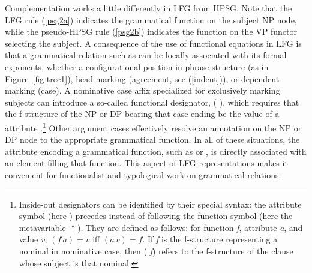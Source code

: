 Complementation works a little differently in LFG from HPSG.  Note that the LFG  rule (\ref{psg2a}) indicates the  grammatical function on the subject NP node, while the pseudo-HPSG rule (\ref{psg2b}) indicates the  function on the VP functor selecting the subject.   A consequence of the use of functional equations in LFG is that a grammatical relation such as  can be locally associated with its formal exponents, whether a configurational position in phrase structure (as in Figure~\ref{fig-tree1}), head-marking (agreement, see (\ref{indent})), or dependent marking (case).  A nominative case affix specialized for exclusively marking subjects can introduce a so-called  functional designator, ( \Up),
 which requires that the f-structure of the NP or DP bearing that case ending be the value of a  attribute \citep{Nordlinger98a-u}.\footnote{Inside-out designators can be identified by their special syntax: the attribute symbol (here ) precedes instead of following the function symbol (here the metavariable $\uparrow$).  
They are defined as follows:  for function \textit{f}, attribute \textit{a}, and value \textit{v}, $(f \, a) = v$ iff $(a \, v) = f$. If \textit{f} is the f-structure representing a nominal in nominative case, then ( \textit{f}) refers to the f-structure of the clause whose subject is that nominal.}  Other argument cases effectively resolve an annotation on the NP or DP node to the appropriate grammatical function.  In all of these situations, the attribute encoding a grammatical function, such as  or , is directly associated with an element filling that function.  This aspect of LFG representations makes it convenient for functionalist and typological work on grammatical relations.  

 
